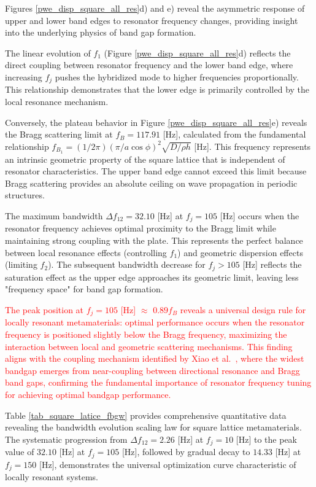\documentclass[review,numbers,sort&compress]{elsarticle}
\begin{document}
Figures \ref{pwe_disp_square_all_res}d) and e) reveal the asymmetric response of upper and lower band edges to resonator frequency changes, providing insight into the underlying physics of band gap formation. 

The linear evolution of $f_1$ (Figure \ref{pwe_disp_square_all_res}d) reflects the direct coupling between resonator frequency and the lower band edge, where increasing $f_j$ pushes the hybridized mode to higher frequencies proportionally. This relationship demonstrates that the lower edge is primarily controlled by the local resonance mechanism.

Conversely, the plateau behavior in Figure \ref{pwe_disp_square_all_res}e) reveals the Bragg scattering limit at $f_B = 117.91$ [Hz], calculated from the fundamental relationship $f_{B_1} = (1/2\pi)(\pi/a\cos\phi)^2 \sqrt{D/\rho h}$ [Hz]. This frequency represents an intrinsic geometric property of the square lattice that is independent of resonator characteristics. The upper band edge cannot exceed this limit because Bragg scattering provides an absolute ceiling on wave propagation in periodic structures.

The maximum bandwidth $\Delta f_{12} = 32.10$ [Hz] at $f_j = 105$ [Hz] occurs when the resonator frequency achieves optimal proximity to the Bragg limit while maintaining strong coupling with the plate. This represents the perfect balance between local resonance effects (controlling $f_1$) and geometric dispersion effects (limiting $f_2$). The subsequent bandwidth decrease for $f_j > 105$ [Hz] reflects the saturation effect as the upper edge approaches its geometric limit, leaving less "frequency space" for band gap formation.

\textcolor{red}{The peak position at $f_j = 105$ [Hz] $\approx$ $0.89 f_B$ reveals a universal design rule for locally resonant metamaterials: optimal performance occurs when the resonator frequency is positioned slightly below the Bragg frequency, maximizing the interaction between local and geometric scattering mechanisms. This finding aligns with the coupling mechanism identified by Xiao et al.~\cite{Xiao_2012}, where the widest bandgap emerges from near-coupling between directional resonance and Bragg band gaps, confirming the fundamental importance of resonator frequency tuning for achieving optimal bandgap performance.} 

Table \ref{tab_square_latice_fbgw} provides comprehensive quantitative data revealing the bandwidth evolution scaling law for square lattice metamaterials. The systematic progression from $\Delta f_{12} = 2.26$ [Hz] at $f_j = 10$ [Hz] to the peak value of $32.10$ [Hz] at $f_j = 105$ [Hz], followed by gradual decay to $14.33$ [Hz] at $f_j = 150$ [Hz], demonstrates the universal optimization curve characteristic of locally resonant systems.
\end{document}
